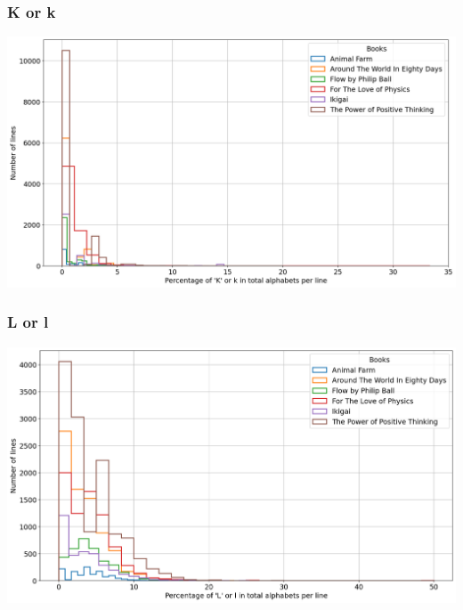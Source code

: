 \begin{frame}
    \frametitle{K or k}
    \begin{center}
        \hspace*{-5ex}
        \includegraphics[scale=0.35]{../01_programFiles/histograms/k.png}\hspace{10ex}
    \end{center}
\end{frame}

\begin{frame}
    \frametitle{L or l}
    \begin{center}
        \hspace*{-5ex}
        \includegraphics[scale=0.35]{../01_programFiles/histograms/l.png}\hspace{10ex}
    \end{center}
\end{frame}

